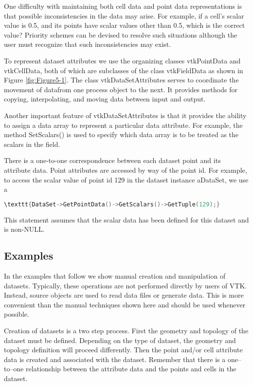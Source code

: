 One difficulty with maintaining both cell data and point data representations is that possible inconsistencies in the data may arise. For example, if a cell's scalar value is 0.5, and its points have scalar values other than 0.5, which is the correct value? Priority schemes can be devised to resolve such situations although the user must recognize that such inconsistencies may exist.

To represent dataset attributes we use the organizing classes vtkPointData and vtkCellData, both of which are subclasses of the class vtkFieldData as shown in Figure \ref{fig:Figure5-1}. The class vtkDataSetAttributes serves to coordinate the movement of datafrom one process object to the next. It provides methods for copying, interpolating, and moving data between input and output.

Another important feature of vtkDataSetAttributes is that it provides the ability to assign a data array to represent a particular data attribute. For example, the method SetScalars() is used to specify which data array is to be treated as the scalars in the field.

There is a one-to-one correspondence between each dataset point and its attribute data. Point attributes are accessed by way of the point id. For example, to access the scalar value of point id 129 in the dataset instance aDataSet, we use a

\begin{lstlisting}[language=C++,  caption={}, numbers=none, frame=none]
\texttt{DataSet->GetPointData()->GetScalars()->GetTuple(129);}
\end{lstlisting}

This statement assumes that the scalar data has been defined for this dataset and is non-NULL.

\subsection{Examples}

In the examples that follow we show manual creation and manipulation of datasets. Typically, these operations are not performed directly by users of VTK. Instead, source objects are used to read data files or generate data. This is more convenient than the manual techniques shown here and should be used whenever possible.

Creation of datasets is a two step process. First the geometry and topology of the dataset must be defined. Depending on the type of dataset, the geometry and topology definition will proceed differently. Then the point and/or cell attribute data is created and associated with the dataset. Remember that there is a one--to--one relationship between the attribute data and the points and cells in the dataset.

